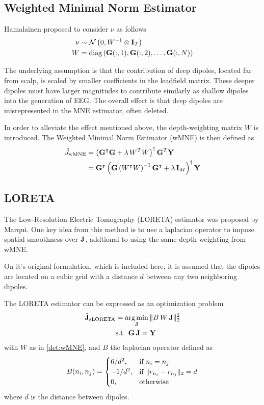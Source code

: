 \subsection{Weighted Minimal Norm Estimator}

Hamalainen proposed to consider $\nu$ as follows
\begin{align}
\nu &\sim
\mathcal{N}\left( 
0, 
W^{-1} \otimes \mathbf{I}_T
 \right)
\\
W &=
\text{diag}\left(   \mathbf{G}(:,1), \mathbf{G}(:,2), \dots, \mathbf{G}(:,N)   \right)
\label{det:wMNE}
\end{align}

The underlying assumption is that the contribution of deep dipoles, located far from scalp, is scaled by smaller coefficients in the leadfield matrix.
%
These deeper dipoles must have larger magnitudes to contribute similarly as shallow dipoles into the generation of EEG.
%
The overall effect is that deep dipoles are misrepresented in the MNE estimator, often deleted.

In order to alleviate the effect mentioned above, the depth-weighting matrix $W$ is introduced.
%
The Weighted Minimal Norm Estimator (wMNE) is then defined as
\begin{align}
\hat{J}_\text{wMNE} 
&=
\left( \mathbf{G}^\intercal \mathbf{G} + \lambda\, W^T W \right)^\dagger \mathbf{G}^T \mathbf{Y} \\
&=
\mathbf{G}^\intercal
\left( \mathbf{G} \left( W^\intercal W \right)^{-1} \mathbf{G}^\intercal + \lambda\, \mathbf{I}_M \right)^\dagger \mathbf{Y}
\label{est:wMNE}
\end{align}

\subsection{LORETA}

The Low-Resolution Electric Tomography (LORETA) estimator was proposed by Marqui\cite{sloreta}.
%
One key idea from this method is to use a laplacian operator to impose spatial smoothness over $\mathbf{J}$, addtional to using the same depth-weighting from wMNE.

On it's original formulation, which is included here, it is assumed that the dipoles are located on a cubic grid with a distance $d$ between any two neighboring dipoles. 

The LORETA estimator can be expressed as an optimization problem
\begin{align}
\hat{\mathbf{J}}_\text{sLORETA} 
&=
\operatorname*{arg\,min}_{\mathbf{J}} \,
\lVert  B\, W\, \mathbf{J}  \rVert _2^2 
\nonumber \\
&\text{s.t. }
\mathbf{G}\, \mathbf{J} = \mathbf{Y}
\end{align}
with $W$ as in \eqref{det:wMNE}, and $B$ the laplacian operator defined as
\begin{equation}
B(n_i, n_j) =
\begin{cases}
6/d^2, &\text{if } n_i=n_j \\
-1/d^2, &\text{if } \lVert r_{n_i}-r_{n_j} \rVert_2 = d \\
0, &\text{otherwise}
\end{cases}
\end{equation}
where $d$ is the distance between dipoles.

